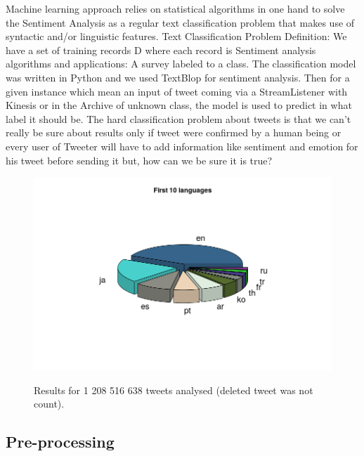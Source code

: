 \documentclass{acmtog} %
\begin{document}
Machine learning approach relies on statistical algorithms in one hand to solve the Sentiment Analysis as a regular text classification problem that makes use of syntactic and/or linguistic features. Text Classification Problem Definition: We have a set of training records D where each record is Sentiment analysis algorithms and applications: A survey labeled to a class. The classification model was written in Python and we used TextBlop for sentiment analysis. Then for a given instance which mean an input of tweet coming via a StreamListener with Kinesis or in the Archive of unknown class, the model is used to predict in what label it should be. The hard classification problem about tweets is that we can’t really be sure about results only if tweet were confirmed by a human being or every user of Tweeter will have to add information like sentiment and emotion for his tweet before sending it but, how can we be sure it is true?

\begin{figure}[h!]
{\includegraphics[width=\linewidth]{first_ten_languages.png}}
\caption{Results for 1 208 516 638 tweets analysed (deleted tweet was not count).}
  \label{fig:trump_results}
\end{figure}


\subsection{Pre-processing}
\label{subsub:preprocessing}
\end{document}
